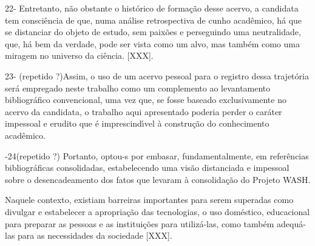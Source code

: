\documentclass[
12pt,		%
openright,	%
twoside,  %
a4paper,			%
chapter=TITLE,		%
english,			%
french,				%
spanish,			%
brazil				%
]{USPSC-classe/USPSC}
\begin{document}
22- Entretanto, n\~ao obstante o hist\'orico de forma\c{c}\~ao desse acervo, a candidata tem consci\^encia de que, numa an\'alise retrospectiva de cunho acad\^emico, h\'a que se distanciar do objeto de estudo, sem paix\~oes e perseguindo uma neutralidade, que, h\'a bem da verdade, pode ser vista como um alvo, mas tamb\'em como uma miragem no universo da ci\^encia. [XXX].




23- (repetido ?)Assim, o uso de um acervo pessoal para o registro dessa trajet\'oria ser\'a empregado neste trabalho como um complemento ao levantamento bibliogr\'afico convencional, uma vez que, se fosse baseado exclusivamente no acervo da candidata, o trabalho aqui apresentado poderia perder o car\'ater impessoal e erudito que \'e imprescind\'{\i}vel \`a constru\c{c}\~ao do conhecimento acad\^emico.




-24(repetido ?) Portanto, optou-s por embasar, fundamentalmente, em refer\^encias bibliogr\'aficas consolidadas, estabelecendo uma vis\~ao distanciada e impessoal sobre o desencadeamento dos fatos que levaram \`a consolida\c{c}\~ao do Projeto WASH.




Naquele contexto, existiam barreiras importantes para serem superadas como divulgar e estabelecer a apropria\c{c}\~ao das tecnologias, o uso dom\'estico, educacional para preparar as pessoas e as institui\c{c}\~oes para utiliz\'a-las, como tamb\'em adequ\'a-las para as necessidades da sociedade [XXX].







\postextual




%
%
\end{document}
